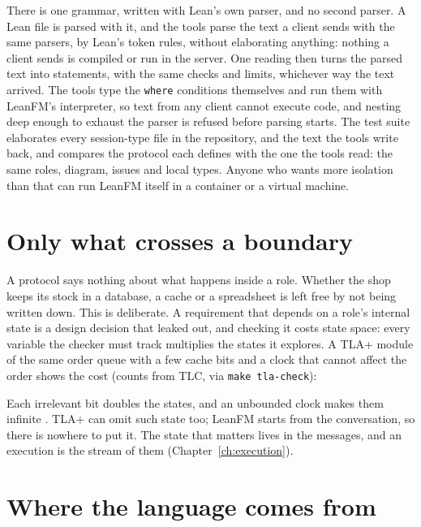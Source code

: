 There is one grammar, written with Lean's own parser, and no second parser. A
Lean file is parsed with it, and the tools parse the text a client sends with the
same parsers, by Lean's token rules, without elaborating anything: nothing a client
sends is compiled or run in the server. One reading then turns the parsed text
into statements, with the same checks and limits, whichever way the text arrived.
The tools type the \texttt{where} conditions themselves and run them with
LeanFM's interpreter, so text from any client cannot execute code, and nesting
deep enough to exhaust the parser is refused before parsing starts. The test
suite elaborates every session-type file in the repository, and the text the tools
write back, and compares the protocol each defines with the one the tools read:
the same roles, diagram, issues and local types. Anyone who wants more isolation
than that can run LeanFM itself in a container or a virtual machine.

\section{Only what crosses a boundary}

A protocol says nothing about what happens inside a role. Whether the shop keeps
its stock in a database, a cache or a spreadsheet is left free by not being
written down. This is deliberate. A requirement that depends on a role's internal
state is a design decision that leaked out, and checking it costs state space:
every variable the checker must track multiplies the states it explores. A
TLA+ module of the same order queue with a few cache bits and a clock that cannot
affect the order shows the cost (counts from TLC, via \texttt{make tla-check}):

\begin{center}

\end{center}

Each irrelevant bit doubles the states, and an unbounded clock makes them
infinite \citep{lamport2002specifying}. TLA+ can omit such state too; LeanFM
starts from the conversation, so there is nowhere to put it. The state that
matters lives in the messages, and an execution is the stream of them
(Chapter~\ref{ch:execution}).

\section{Where the language comes from}

